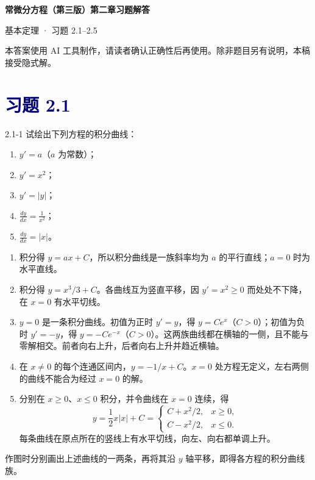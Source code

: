 \documentclass[UTF8,a4paper,11pt]{ctexart}
\newcommand{\sect}[1]{\section*{\textcolor{navy}{习题 #1}}}
\begin{document}
\begin{center}
  {\LARGE\bfseries\color{navy}常微分方程（第三版）第二章习题解答\par}
  \vspace{0.35em}
  {\color{pink}基本定理 · 习题 2.1--2.5\par}
\end{center}
\begin{center}
  \small\color{gray}本答案使用 AI 工具制作，请读者确认正确性后再使用。除非题目另有说明，本稿接受隐式解。
\end{center}
\sect{2.1}
\begin{problem}{2.1-1}
试绘出下列方程的积分曲线：
  \begin{enumerate}[label=(\arabic*)]
    \item $y'=a$（$a$ 为常数）；
    \item $y'=x^2$；
    \item $y'=|y|$；
    \item $\displaystyle \frac{dy}{dx}=\frac{1}{x^2}$；
    \item $\displaystyle \frac{dy}{dx}=|x|$。
  \end{enumerate}
\end{problem}

\begin{solution}
\begin{enumerate}[label=(\arabic*)]
\item 积分得 $y=ax+C$，所以积分曲线是一族斜率均为 $a$ 的平行直线；$a=0$ 时为水平直线。
\item 积分得 $y=x^3/3+C$。各曲线互为竖直平移，因 $y'=x^2\ge0$ 而处处不下降，在 $x=0$ 有水平切线。
\item $y=0$ 是一条积分曲线。初值为正时 $y'=y$，得 $y=Ce^x$（$C>0$）；初值为负时 $y'=-y$，得 $y=-Ce^{-x}$（$C>0$）。这两族曲线都在横轴的一侧，且不能与零解相交。前者向右上升，后者向右上升并趋近横轴。
\item 在 $x\ne0$ 的每个连通区间内，$y=-1/x+C$。$x=0$ 处方程无定义，左右两侧的曲线不能合为经过 $x=0$ 的解。
\item 分别在 $x\ge0$、$x\le0$ 积分，并令曲线在 $x=0$ 连续，得
\[
y=\frac12x|x|+C=
\begin{cases}C+x^2/2,&x\ge0,\\C-x^2/2,&x\le0.\end{cases}
\]
每条曲线在原点所在的竖线上有水平切线，向左、向右都单调上升。
\end{enumerate}
作图时分别画出上述曲线的一两条，再将其沿 $y$ 轴平移，即得各方程的积分曲线族。
\end{solution}
\end{document}

